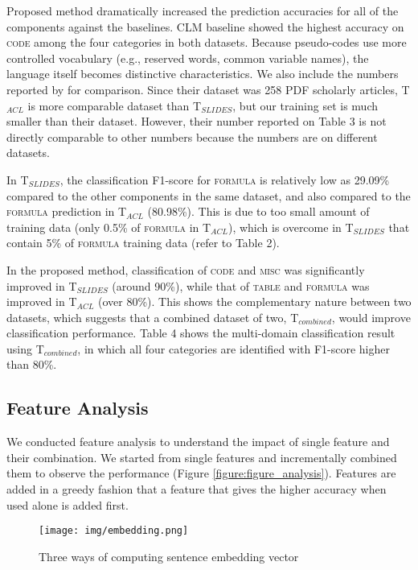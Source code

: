 \documentclass[11pt,letterpaper]{article}
\begin{document}
Proposed method dramatically increased the prediction accuracies for all of the components against the baselines. CLM baseline showed the highest accuracy on \textsc{code} among the four categories in both datasets. Because pseudo-codes use more controlled vocabulary (e.g., reserved words, common variable names), the language itself becomes distinctive characteristics. We also include the numbers reported by  for comparison. Since their dataset was 258 PDF scholarly articles, T$_{ACL}$ is more comparable dataset than T$_{SLIDES}$, but our training set is much smaller than their dataset. However, their number reported on Table 3 is not directly comparable to other numbers because the numbers are on different datasets.

In T$_{SLIDES}$, the classification F1-score for \textsc{formula} is relatively low as 29.09\% compared to the other components in the same dataset, and also compared to the \textsc{formula} prediction in T$_{ACL}$ (80.98\%). This is due to too small amount of training data (only 0.5\% of \textsc{formula} in T$_{ACL}$), which is overcome in T$_{SLIDES}$ that contain 5\% of \textsc{formula} training data (refer to Table 2).  

In the proposed method, classification of \textsc{code} and \textsc{misc} was significantly improved in T$_{SLIDES}$ (around 90\%), while that of \textsc{table} and \textsc{formula} was improved in T$_{ACL}$ (over 80\%). This shows the complementary nature between two datasets, which suggests that a combined dataset of two, T$_{combined}$, would improve classification performance. Table 4 shows the multi-domain classification result using T$_{combined}$, in which all four categories are identified with F1-score higher than 80\%. 

\subsection{Feature Analysis}
We conducted feature analysis to understand the impact of single feature and their combination. We started from single features and incrementally combined them to observe the performance (Figure \ref{figure:figure_analysis}). Features are added in a greedy fashion that a feature that gives the higher accuracy when used alone is added first. 

\begin{figure}[t]
\centering
\texttt{[image: img/embedding.png]}
\vspace{-3mm}
\caption{Three ways of computing sentence embedding vector}
\label{figure:embedding}
\end{figure}
\end{document}
